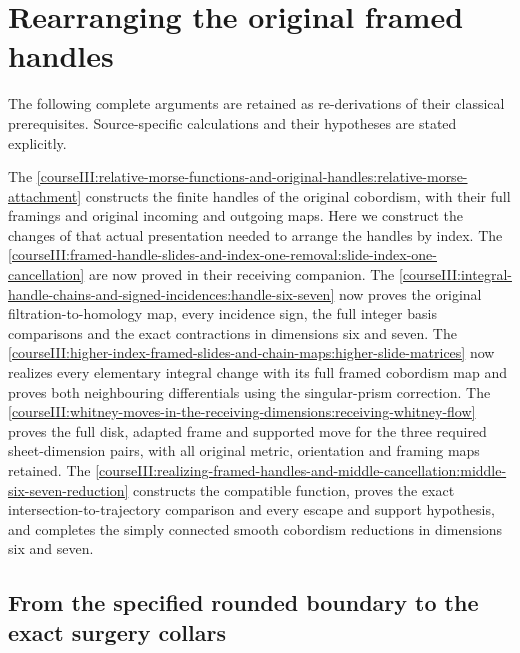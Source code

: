 \section{Rearranging the original framed handles}\label{courseIII:rearranging-the-original-framed-handles:section}

The following complete arguments are retained as re-derivations of their classical prerequisites. Source-specific calculations and their hypotheses are stated explicitly.

The \cref{courseIII:relative-morse-functions-and-original-handles:relative-morse-attachment} constructs the finite handles of the original cobordism, with their full framings and original incoming and outgoing maps. Here we construct the changes of that actual presentation needed to arrange the handles by index. The \cref{courseIII:framed-handle-slides-and-index-one-removal:slide-index-one-cancellation} are now proved in their receiving companion. The \cref{courseIII:integral-handle-chains-and-signed-incidences:handle-six-seven} now proves the original filtration-to-homology map, every incidence sign, the full integer basis comparisons and the exact contractions in dimensions six and seven. The \cref{courseIII:higher-index-framed-slides-and-chain-maps:higher-slide-matrices} now realizes every elementary integral change with its full framed cobordism map and proves both neighbouring differentials using the singular-prism correction. The \cref{courseIII:whitney-moves-in-the-receiving-dimensions:receiving-whitney-flow} proves the full disk, adapted frame and supported move for the three required sheet-dimension pairs, with all original metric, orientation and framing maps retained. The \cref{courseIII:realizing-framed-handles-and-middle-cancellation:middle-six-seven-reduction} constructs the compatible function, proves the exact intersection-to-trajectory comparison and every escape and support hypothesis, and completes the simply connected smooth cobordism reductions in dimensions six and seven.

\subsection{From the specified rounded boundary to the exact surgery collars}
\label{courseIII:rearranging-the-original-framed-handles:arrangement-boundary-comparison}

\label{courseIII:rearranging-the-original-framed-handles:section-1}\label{courseIII:handle-arrangement:1}

